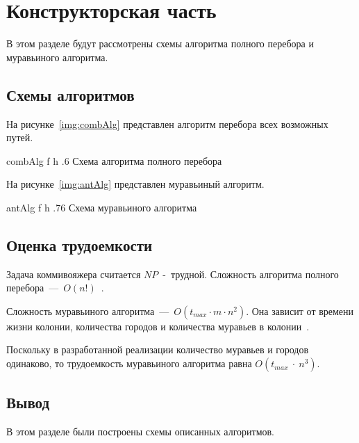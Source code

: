 \chapter{Конструкторская часть}
В этом разделе будут рассмотрены схемы алгоритма полного перебора и муравьиного алгоритма.

\section{Схемы алгоритмов}
На рисунке~\ref{img:combAlg} представлен алгоритм перебора всех возможных путей.

	{combAlg} 
	{f}
	{h}
	{.6\textwidth}
	{Схема алгоритма полного перебора}

\clearpage

На рисунке~\ref{img:antAlg} представлен муравьиный алгоритм.

	{antAlg}
	{f}
	{h} 
	{.76\textwidth} 
	{Схема муравьиного алгоритма} 

\clearpage

\section{Оценка трудоемкости}
Задача коммивояжера считается $NP$~-~трудной.
Сложность алгоритма полного перебора~---~$O(n!)$~\cite{salesman}.

Сложность муравьиного алгоритма~---~$O(t_{max} \cdot m \cdot n^2)$.
Она зависит от времени жизни колонии, количества городов и количества муравьев в колонии~\cite{ulyanov}. 

Поскольку в разработанной реализации количество муравьев и городов одинаково, то трудоемкость муравьиного алгоритма равна $O(t_{max}~\cdot~n^3)$.

\section*{Вывод}
В этом разделе были построены схемы описанных алгоритмов.
